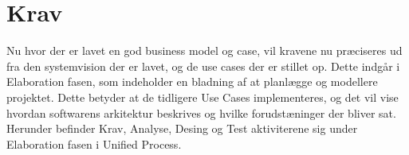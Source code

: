 \chapter{Krav}\label{ch:krav}


Nu hvor der er lavet en god business model og case, vil kravene nu præciseres ud fra den systemvision der er lavet, og de use cases der er stillet op. Dette indgår i Elaboration fasen, som indeholder en bladning af at planlægge og modellere projektet. Dette betyder at de tidligere Use Cases implementeres, og det vil vise hvordan softwarens arkitektur beskrives og hvilke forudstæninger der bliver sat. Herunder befinder Krav, Analyse, Desing og Test aktiviterene sig under Elaboration fasen i Unified Process\cite{UnifiedProcess}. 



 